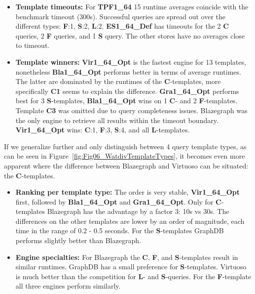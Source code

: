 \begin{itemize}
	\item \textbf{Template timeouts:} For \textbf{TPF1\_64} 15 runtime averages coincide with the benchmark timeout (300s). Successful queries are spread out over the different types: \textbf{F}:1, \textbf{S}:2, \textbf{L}:2.
	\textbf{ES1\_64\_Def} has timeouts for the 2 \textbf{C} queries,  2 \textbf{F} queries, and 1 \textbf{S} query. The other stores have no averages close to timeout.
	
	\item  \textbf{Template winners:} \textbf{Vir1\_64\_Opt} is the fastest engine for 13 templates, nonetheless \textbf{Bla1\_64\_Opt} performs better in terms of average runtimes. The latter are dominated by the runtimes of the \textbf{C}-templates, more specifically \textbf{C1} seems to explain the difference. 
	\textbf{Gra1\_64\_Opt} performs best for 3 \textbf{S}-templates, \textbf{Bla1\_64\_Opt} wins on 1 \textbf{C}- and 2 \textbf{F}-templates. Template \textbf{C3} was omitted due to query completeness issues. Blazegraph was the only engine to retrieve all results within the timeout boundary.
	\textbf{Vir1\_64\_Opt} wins: \textbf{C}:1, \textbf{F}:3, \textbf{S}:4, and all \textbf{L}-templates.
\end{itemize}
If we generalize further and only distinguish between 4 query template types, as can be seen in Figure~\ref{fig:Fig06_WatdivTemplateTypes}, it becomes even more apparent where the difference between Blazegraph and Virtuoso can be situated: the \textbf{C}-templates.
\begin{itemize}
	\item \textbf{Ranking per template type:} The order is very stable, \textbf{Vir1\_64\_Opt} first, followed by \textbf{Bla1\_64\_Opt} and \textbf{Gra1\_64\_Opt}. Only for \textbf{C}-templates Blazegraph has the advantage  by a factor 3: 10s vs 30s. The differences on the other templates are lower by an order of magnitude, each time in the range of 0.2 - 0.5 seconds. For the \textbf{S}-templates GraphDB performs slightly better than Blazegraph.
	\item \textbf{Engine specialties:} For Blazegraph the \textbf{C}, \textbf{F}, and \textbf{S}-templates result in similar runtimes. GraphDB has a small preference for \textbf{S}-templates. Virtuoso is much better than the competition for \textbf{L}- and \textbf{S}-queries. For the \textbf{F}-template all three engines perform similarly.
\end{itemize}


